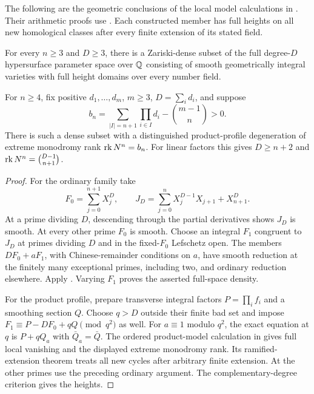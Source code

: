 The following are the geometric conclusions of the local model
calculations in \cite{InternalDense}. Their arithmetic proofs use
. Each constructed member has full
heights on all new homological classes after every finite extension
of its stated field.

\begin{theorem}\label{thm:dense-hypersurfaces}
For every $n\geq3$ and $D\geq3$, there is a Zariski-dense subset
of the full degree-$D$ hypersurface parameter space over $\mathbb Q$
consisting of smooth geometrically integral varieties with full
height domains over every number field.

For $n\geq4$, fix positive $d_1,\ldots,d_m$, $m\geq3$,
$D=\sum_i d_i$, and suppose
\[
 b_n=\sum_{|I|=n+1}\prod_{i\in I}d_i-\binom{m-1}{n}>0.
\]
There is such a dense subset with a distinguished product-profile
degeneration of extreme monodromy rank $\operatorname{rk} N^n=b_n$. For linear
factors this gives $D\geq n+2$ and
$\operatorname{rk} N^n=\binom{D-1}{n+1}$.
\end{theorem}

\begin{proof}
For the ordinary family take
\[
 F_0=\sum_{j=0}^{n+1}X_j^D,\qquad
 J_D=\sum_{j=0}^n X_j^{D-1}X_{j+1}+X_{n+1}^D.
\]
At a prime dividing $D$, descending through the partial derivatives
shows $J_D$ is smooth. At every other prime $F_0$ is smooth.
Choose an integral $F_1$ congruent to $J_D$ at primes dividing
$D$ and in the fixed-$F_0$ Lefschetz open. The members
$DF_0+aF_1$, with Chinese-remainder conditions on $a$, have smooth
reduction at the finitely many exceptional primes, including two,
and ordinary reduction elsewhere. Apply .
Varying $F_1$ proves the asserted full-space density.

For the product profile, prepare transverse integral factors
$P=\prod_i f_i$ and a smoothing section $Q$. Choose
$q>D$ outside their finite bad set and impose
$F_1\equiv P-DF_0+qQ\pmod{q^2}$ as well. For $a\equiv1$
modulo $q^2$, the exact equation at $q$ is $P+qQ_a$ with
$\bar Q_a=\bar Q$. The ordered product-model calculation in
\cite{InternalDense} gives full local vanishing and the displayed
extreme monodromy rank. Its ramified-extension theorem treats all
new cycles after arbitrary finite extension. At the other primes
use the preceding ordinary argument. The complementary-degree
criterion gives the heights.
\end{proof}

